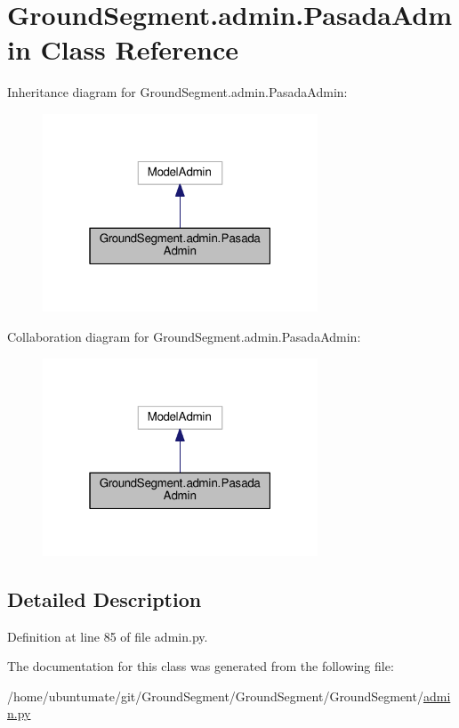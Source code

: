 \hypertarget{class_ground_segment_1_1admin_1_1_pasada_admin}{}\section{Ground\+Segment.\+admin.\+Pasada\+Admin Class Reference}
\label{class_ground_segment_1_1admin_1_1_pasada_admin}


Inheritance diagram for Ground\+Segment.\+admin.\+Pasada\+Admin\+:\nopagebreak
\begin{figure}[H]
\begin{center}
\leavevmode
\includegraphics[width=232pt]{class_ground_segment_1_1admin_1_1_pasada_admin__inherit__graph}
\end{center}
\end{figure}


Collaboration diagram for Ground\+Segment.\+admin.\+Pasada\+Admin\+:\nopagebreak
\begin{figure}[H]
\begin{center}
\leavevmode
\includegraphics[width=232pt]{class_ground_segment_1_1admin_1_1_pasada_admin__coll__graph}
\end{center}
\end{figure}


\subsection{Detailed Description}


Definition at line 85 of file admin.\+py.



The documentation for this class was generated from the following file\+:\begin{DoxyCompactItemize}
\item 
/home/ubuntumate/git/\+Ground\+Segment/\+Ground\+Segment/\+Ground\+Segment/\hyperlink{admin_8py}{admin.\+py}\end{DoxyCompactItemize}
